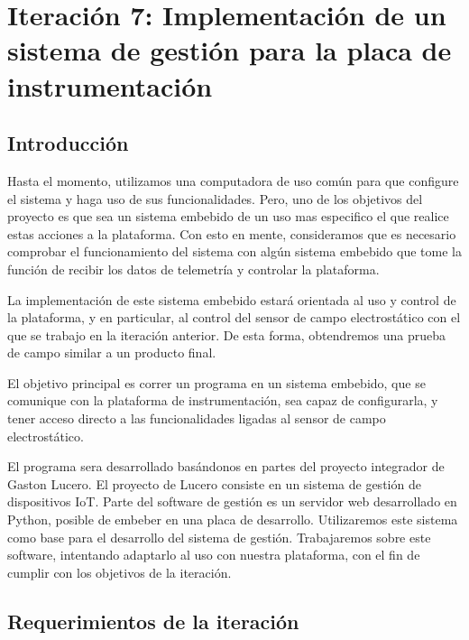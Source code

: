 \chapter{Iteración 7: Implementación de un sistema de gestión para la placa de instrumentación} %
\label{cha:iteracion_7}

\section{Introducción} %
\label{it7:sec:introduccion}

Hasta el momento, utilizamos una computadora de uso común para que configure el sistema y haga uso de sus funcionalidades. Pero, uno de los objetivos del proyecto es que sea un sistema embebido de un uso mas especifico el que realice estas acciones a la plataforma. Con esto en mente, consideramos que es necesario comprobar el funcionamiento del sistema con algún sistema embebido que tome la función de recibir los datos de telemetría y controlar la plataforma.

La implementación de este sistema embebido estará orientada al uso y control de la plataforma, y en particular, al control del sensor de campo electrostático con el que se trabajo en la iteración anterior. De esta forma, obtendremos una prueba de campo similar a un producto final.

El objetivo principal es correr un programa en un sistema embebido, que se comunique con la plataforma de instrumentación, sea capaz de configurarla, y tener acceso directo a las funcionalidades ligadas al sensor de campo electrostático.

El programa sera desarrollado basándonos en partes del proyecto integrador de Gaston Lucero. El proyecto de Lucero consiste en un sistema de gestión de dispositivos IoT. Parte del software de gestión es un servidor web desarrollado en Python, posible de embeber en una placa de desarrollo. Utilizaremos este sistema como base para el desarrollo del sistema de gestión. Trabajaremos sobre este software, intentando adaptarlo al uso con nuestra plataforma, con el fin de cumplir con los objetivos de la iteración.


\section{Requerimientos de la iteración} %
\label{it7:sec:requerimientos_de_la_iteracion}

